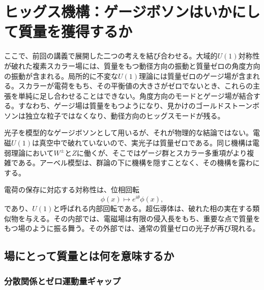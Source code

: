 \chapter{ヒッグス機構：ゲージボソンはいかにして質量を獲得するか}

ここで、前回の講義で展開した二つの考えを結び合わせる。大域的\(U(1)\)対称性が破れた複素スカラー場には、質量をもつ動径方向の振動と質量ゼロの角度方向の振動が含まれる。局所的に不変な\(U(1)\)理論には質量ゼロのゲージ場が含まれる。スカラーが電荷をもち、その平衡値の大きさがゼロでないとき、これらの主張を単純に足し合わせることはできない。角度方向のモードとゲージ場が結合する。すなわち、ゲージ場は質量をもつようになり、見かけのゴールドストーンボソンは独立な粒子ではなくなり、動径方向のヒッグスモードが残る。

光子を模型的なゲージボソンとして用いるが、それが物理的な結論ではない。電磁\(U(1)\)は真空中で破れていないので、実光子は質量ゼロである。同じ機構は電弱理論において\(W^\pm\)と\(Z\)に働くが、そこではゲージ群とスカラー多重項がより複雑である。アーベル模型は、群論の下に機構を隠すことなく、その機構を露わにする。

\begin{classroomqa}
\end{classroomqa}

電荷の保存に対応する対称性は、位相回転
\begin{equation}
  \phi(x)\longmapsto e^{i\theta}\phi(x),
\end{equation}
であり、\(U(1)\)と呼ばれる内部回転である。超伝導体は、破れた相の実在する類似物を与える。その内部では、電磁場は有限の侵入長をもち、重要な点で質量をもつ場のように振る舞う。その外部では、通常の質量ゼロの光子が再び現れる。

\section{場にとって質量とは何を意味するか}

\subsection{分散関係とゼロ運動量ギャップ}

